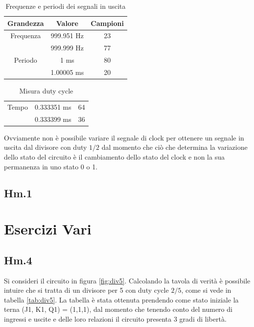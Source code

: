 \documentclass[journal, a4paper]{IEEEtran}
\begin{document}
\begin{table}[htp]
\centering
\caption{Frequenze e periodi dei segnali in uscita}
\label{tab:es6-2}
\begin{tabular}{|c|c|c|}
\hline
Grandezza & Valore & Campioni\\
\hline 
Frequenza & 999.951 Hz & 23 \\ \cline{2-3}
          & 999.999 Hz & 77 \\ 
\hline 
Periodo & 1 ms & 80       \\ \cline{2-3}
        & 1.00005 ms & 20 \\ 
\hline 
\end{tabular} 
\end{table}

\begin{table}[htp]
\centering
\caption{Misura duty cycle}
\label{tab:es6-3}
\begin{tabular}{|c|c|c|}
\hline
Tempo  & 0.333351 ms & 64 \\ \cline{2-3}
       & 0.333399 ms & 36 \\ 
\hline 
\end{tabular} 
\end{table}

Ovviamente non è possibile variare il segnale di clock per ottenere un segnale in uscita dal divisore con duty $1/2$ dal momento che ciò che determina la variazione dello stato del circuito è il cambiamento dello stato del clock e non la sua permanenza in uno stato 0 o 1.

\subsection{Hm.1}

\section{Esercizi Vari}

\subsection{Hm.4}
Si consideri il circuito in figura \ref{fig:div5}. Calcolando la tavola di verità è possibile intuire che si tratta di un divisore per 5 con duty cycle $2/5$, come si vede in tabella \ref{tab:div5}. La tabella è stata ottenuta prendendo come stato iniziale la terna (J1, K1, Q1) = (1,1,1), dal momento che tenendo conto del numero di ingressi e uscite e delle loro relazioni il circuito presenta 3 gradi di libertà.
\end{document}
